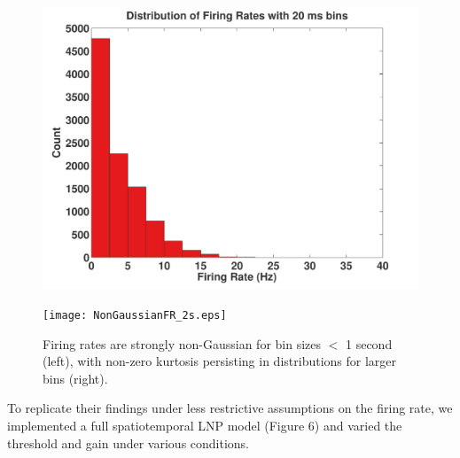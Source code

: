 \documentclass[12pt]{article}
\begin{document}
\begin{figure}[h!!]
\centering
\begin{minipage}[b]{0.45\linewidth}
\centering
\includegraphics[width=\textwidth]{NonGaussianFR.pdf}
\end{minipage}
\begin{minipage}[b]{0.45\linewidth}
\centering
\texttt{[image: NonGaussianFR\_2s.eps]}
\end{minipage}
\caption{Firing rates are strongly non-Gaussian for bin sizes $<$ 1 second (left), with non-zero kurtosis persisting in distributions for larger bins (right).}
\label{Figure 5}
\end{figure}

To replicate their findings under less restrictive assumptions on the firing rate, we implemented a full spatiotemporal LNP model (Figure 6) and varied the threshold and gain under various conditions.
\end{document}
